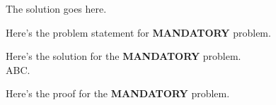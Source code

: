 \documentclass[a4paper, 10pt]{article}
\begin{document}
\begin{solution}
The solution goes here.
\end{solution}


\begin{tosubmit}
\problem[16]
Here's the problem statement for \textbf{MANDATORY} problem.

\par\noindent\submitsolution
Here's the solution for the \textbf{MANDATORY} problem. \\
ABC.

\proof
Here's the proof for the \textbf{MANDATORY} problem.
\end{tosubmit}
\end{document}

